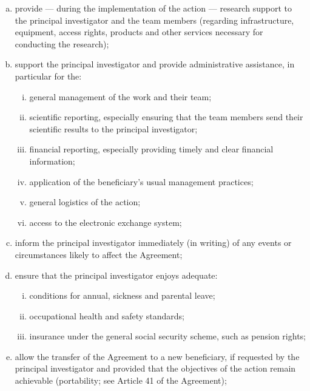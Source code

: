 \documentclass[12pt,a4paper]{article}
\begin{document}
\begin{enumerate}[a), itemsep=-2pt]
    \item provide --- during the implementation of the action --- research
    support to the principal investigator and the team members (regarding
    infrastructure, equipment, access rights, products and other services
    necessary for conducting the research);

    \item support the principal investigator and provide administrative assistance,
    in particular for the:

    \begin{enumerate}[i),itemsep=-5pt,partopsep=-5pt]
        \item general management of the work and their team;
        \item scientific reporting, especially ensuring that the team members send
        their scientific results to the principal investigator;
        \item financial reporting, especially providing timely and clear financial
        information;
        \item application of the beneficiary's usual management practices;
        \item general logistics of the action;
        \item access to the electronic exchange system;
    \end{enumerate}

    \item inform the principal investigator immediately (in writing) of any
    events or circumstances likely to affect the Agreement;

    \item ensure that the principal investigator enjoys adequate:

    \begin{enumerate}[i),itemsep=-5pt,partopsep=-5pt]
        \item conditions for annual, sickness and parental leave;
        \item occupational health and safety standards;
        \item insurance under the general social security scheme, such as
        pension rights;
    \end{enumerate}

    \item allow the transfer of the Agreement to a new beneficiary, if
    requested by the principal investigator and provided that the objectives of
    the action remain achievable (portability; see Article 41 of the Agreement);


\end{enumerate}
\end{document}
